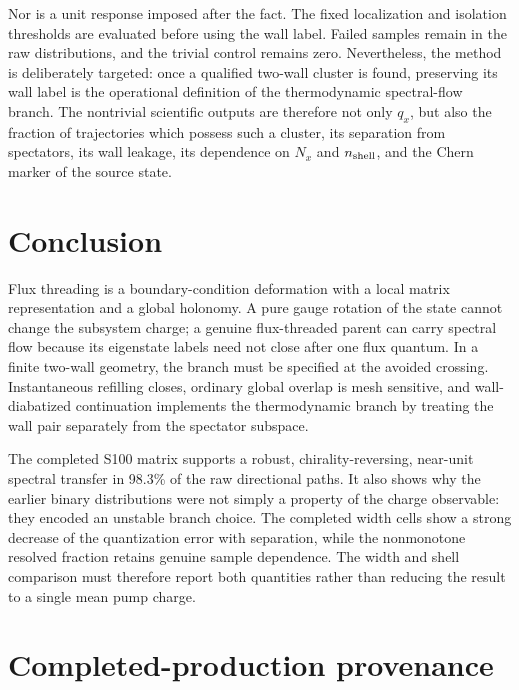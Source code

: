 \documentclass[aps,prb,twocolumn,floatfix,nofootinbib,superscriptaddress]{revtex4-2}
\begin{document}
Nor is a unit response imposed after the fact.  The fixed localization and
isolation thresholds are evaluated before using the wall label.  Failed
samples remain in the raw distributions, and the trivial control remains
zero.  Nevertheless, the method is deliberately targeted: once a qualified
two-wall cluster is found, preserving its wall label is the operational
definition of the thermodynamic spectral-flow branch.  The nontrivial
scientific outputs are therefore not only $q_x$, but also the fraction of
trajectories which possess such a cluster, its separation from spectators,
its wall leakage, its dependence on $N_x$ and $n_{\rm shell}$, and the Chern
marker of the source state.

\section{Conclusion}

Flux threading is a boundary-condition deformation with a local matrix
representation and a global holonomy.  A pure gauge rotation of the state
cannot change the subsystem charge; a genuine flux-threaded parent can carry
spectral flow because its eigenstate labels need not close after one flux
quantum.  In a finite two-wall geometry, the branch must be specified at the
avoided crossing.  Instantaneous refilling closes, ordinary global overlap is
mesh sensitive, and wall-diabatized continuation implements the
thermodynamic branch by treating the wall pair separately from the spectator
subspace.

The completed S100 matrix supports a robust, chirality-reversing, near-unit
spectral transfer in 98.3\% of the raw directional paths.  It also shows why
the earlier binary distributions were not simply a property of the charge
observable: they encoded an unstable branch choice.  The completed width
cells show a strong decrease of the quantization error with separation, while
the nonmonotone resolved fraction retains genuine sample dependence.  The
width and shell comparison must therefore report both quantities rather than
reducing the result to a single mean pump charge.

\clearpage
\appendix

\section{Completed-production provenance}
\end{document}
